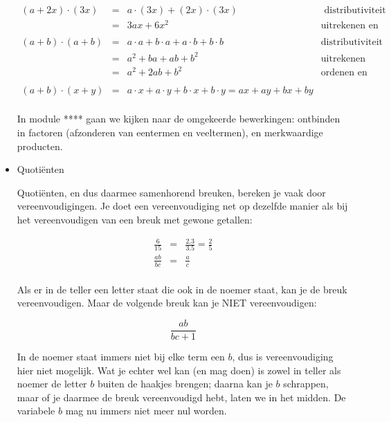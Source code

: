 \begin{itemize}
	\begin{math}
	\begin{array}{ccc|r}
	(a+2x)\cdot(3x) & = & a\cdot(3x)+(2x)\cdot(3x) & \text{ distributiviteit}\\
	& = & 3ax+6x^{2} & \text{uitrekenen en ordenen}\\
	& & & \\
	(a+b)\cdot(a+b) & = & a\cdot a+b\cdot a+a\cdot b+b\cdot b &  \text{distributiviteit}\\
	& = & a^{2}+ba+ab+b^{2} &  \text{uitrekenen}\\
	& = & a^{2}+2ab+b^{2} &  \text{ordenen en optellen}\\
	& &  & \\
	(a+b)\cdot(x+y) & = & a\cdot x+a\cdot y+b\cdot x+b\cdot y=ax+ay+bx+by\\
	\end{array}
	\end{math}
	

	\noindent In module {*}{*}{*}{*} gaan we kijken naar de omgekeerde
	bewerkingen: ontbinden in factoren (afzonderen van eentermen en veeltermen),
	en merkwaardige producten.
	
	
	\item{Quoti\"enten}
	
	Quoti\"enten, en dus daarmee samenhorend breuken, bereken je vaak door
	vereenvoudigingen. Je doet een vereenvoudiging net op dezelfde manier
	als bij het vereenvoudigen van een breuk met gewone getallen:
	
	\begin{eqnarray*}
		\frac{6}{15} & = & \frac{2.3}{3.5} = \frac{2}{5}\\
		\frac{ab}{bc} & = & \frac{a}{c} \\
	\end{eqnarray*}
	

	\noindent Als er in de teller een letter staat die ook in de noemer
	staat, kan je de breuk vereenvoudigen. Maar de volgende breuk kan
	je NIET vereenvoudigen:
	
	\begin{equation*}
		{\displaystyle \frac{ab}{bc+1}}
	\end{equation*}
	
	\noindent In de noemer staat immers niet bij elke term een $b$, dus
	is vereenvoudiging hier niet mogelijk. Wat je echter wel kan (en mag
	doen) is zowel in teller als noemer de letter $b$ buiten de haakjes
	brengen; daarna kan je $b$ schrappen, maar of je daarmee de breuk
	vereenvoudigd hebt, laten we in het midden. De variabele $b$ mag
	nu immers niet meer nul worden.
	

\end{itemize}
